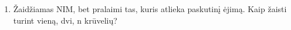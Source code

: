 \begin{enumerate}

\item {} Žaidžiamas NIM, bet pralaimi tas, kuris atlieka paskutinį ėjimą. Kaip žaisti turint vieną, dvi, n krūvelių?



\end{enumerate}
